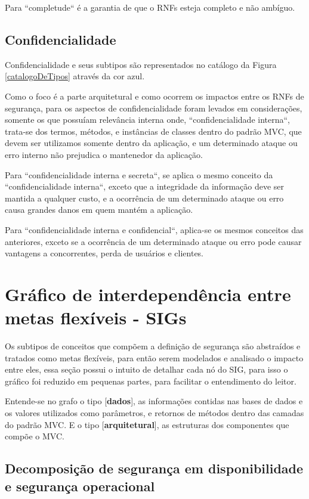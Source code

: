 Para ``completude`` é a garantia de que o RNFs esteja completo e não ambíguo.

\subsection{Confidencialidade}

Confidencialidade e seus subtipos são representados no catálogo da Figura \ref{catalogoDeTipos} através da cor azul. 

Como o foco é a parte arquitetural e como ocorrem os impactos entre os RNFs de segurança, para os aspectos de confidencialidade foram levados em considerações, somente os que possuíam relevância interna onde, ``confidencialidade interna``, trata-se dos termos, métodos, e instâncias de classes dentro do padrão MVC, que devem ser utilizamos somente dentro da aplicação, e um determinado ataque ou erro interno não prejudica o mantenedor da aplicação.

Para ``confidencialidade interna e secreta``, se aplica o mesmo conceito da ``confidencialidade interna``, exceto que a integridade da informação deve ser mantida a qualquer custo, e a ocorrência de um determinado ataque ou erro causa grandes danos em quem mantém a aplicação.

Para ``confidencialidade interna e confidencial``, aplica-se os mesmos conceitos das anteriores, exceto se a ocorrência de um determinado ataque ou erro pode causar vantagens a concorrentes, perda de usuários e clientes. 

\pagebreak

\section{Gráfico de interdependência entre metas flexíveis - SIGs}

Os subtipos de conceitos que compõem a definição de segurança são abstraídos e tratados como metas flexíveis, para então serem modelados e analisado o impacto entre eles, essa seção possui o intuito de detalhar cada nó do SIG, para isso o gráfico foi reduzido em pequenas partes, para facilitar o entendimento do leitor.

Entende-se no grafo o tipo [\textbf{dados}], as informações contidas nas bases de dados e os valores utilizados como parâmetros, e retornos de métodos dentro das camadas do padrão MVC. E o tipo [\textbf{arquitetural}], as estruturas dos componentes que compõe o MVC. 

\subsection{Decomposição de segurança em disponibilidade e segurança operacional}

